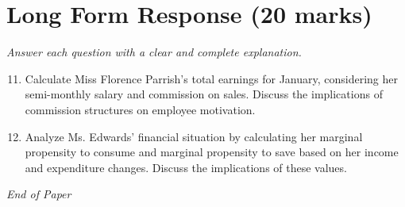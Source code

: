 \documentclass[12pt]{article}
\begin{document}
\section*{Long Form Response (20 marks)}
\textit{Answer each question with a clear and complete explanation.}
\begin{enumerate}[label=\arabic*.]
\setcounter{enumi}{10}
\item Calculate Miss Florence Parrish's total earnings for January, considering her semi-monthly salary and commission on sales. Discuss the implications of commission structures on employee motivation.
\item Analyze Ms. Edwards' financial situation by calculating her marginal propensity to consume and marginal propensity to save based on her income and expenditure changes. Discuss the implications of these values.
\end{enumerate}

\vfill
\noindent\textit{End of Paper}
\end{document}

